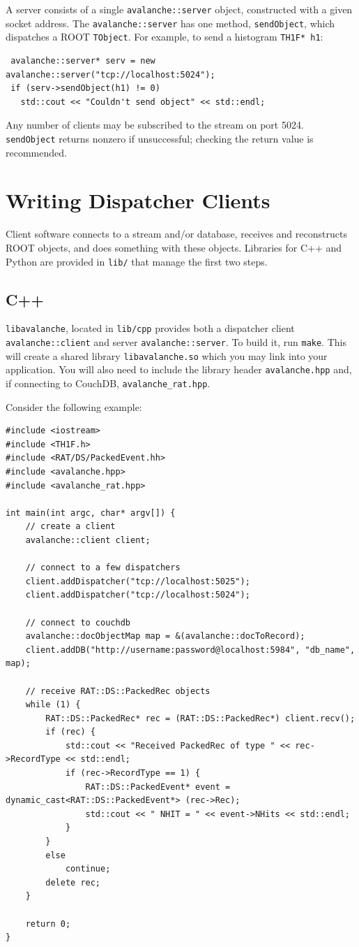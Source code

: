 \documentclass{article}
\begin{document}
A server consists of a single {\tt avalanche::server} object, constructed with a given socket address. The {\tt avalanche::server} has one method, {\tt sendObject}, which dispatches a ROOT {\tt TObject}. For example, to send a histogram {\tt TH1F* h1}:

\begin{verbatim}
 avalanche::server* serv = new avalanche::server("tcp://localhost:5024");
 if (serv->sendObject(h1) != 0)
   std::cout << "Couldn't send object" << std::endl;
\end{verbatim}
Any number of clients may be subscribed to the stream on port 5024. {\tt sendObject} returns nonzero if unsuccessful; checking the return value is recommended.

\section{Writing Dispatcher Clients}
Client software connects to a stream and/or database, receives and reconstructs ROOT objects, and does something with these objects. Libraries for C++ and Python are provided in {\tt lib/} that manage the first two steps.

\subsection{C++}
{\tt libavalanche}, located in {\tt lib/cpp} provides both a dispatcher client {\tt avalanche::client} and server {\tt avalanche::server}. To build it, run {\tt make}. This will create a shared library {\tt libavalanche.so} which you may link into your application. You will also need to include the library header {\tt avalanche.hpp} and, if connecting to CouchDB, {\tt avalanche\_rat.hpp}.

Consider the following example:
\begin{verbatim}
#include <iostream>
#include <TH1F.h>
#include <RAT/DS/PackedEvent.hh>
#include <avalanche.hpp>
#include <avalanche_rat.hpp>

int main(int argc, char* argv[]) {
    // create a client
    avalanche::client client;

    // connect to a few dispatchers
    client.addDispatcher("tcp://localhost:5025");
    client.addDispatcher("tcp://localhost:5024");

    // connect to couchdb
    avalanche::docObjectMap map = &(avalanche::docToRecord);
    client.addDB("http://username:password@localhost:5984", "db_name", map);

    // receive RAT::DS::PackedRec objects
    while (1) {
        RAT::DS::PackedRec* rec = (RAT::DS::PackedRec*) client.recv();
        if (rec) {
            std::cout << "Received PackedRec of type " << rec->RecordType << std::endl;
            if (rec->RecordType == 1) {
                RAT::DS::PackedEvent* event = dynamic_cast<RAT::DS::PackedEvent*> (rec->Rec);
                std::cout << " NHIT = " << event->NHits << std::endl;
            }
        }
        else
            continue;
        delete rec;
    }

    return 0;
}
\end{verbatim}
\end{document}
